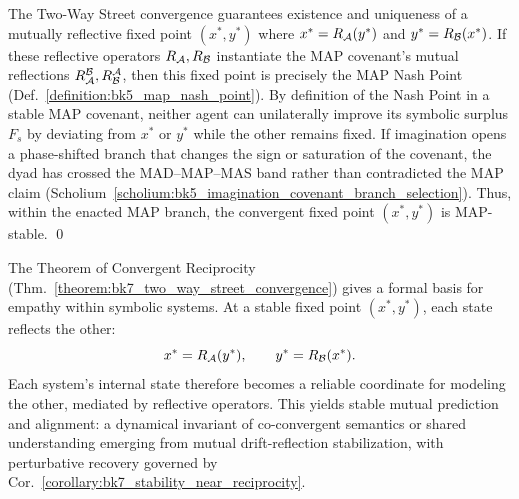 \begin{demonstratio}
\label{demonstratio:bk7_map_stable_mutual_fixed_point}
The Two-Way Street convergence guarantees existence and uniqueness of a mutually reflective fixed point \((x^{\ast}, y^{\ast})\) where \(x^{\ast} = R_{\mathcal{A}}(y^{\ast})\) and \(y^{\ast} = R_{\mathcal{B}}(x^{\ast})\). If these reflective operators \(R_{\mathcal{A}}, R_{\mathcal{B}}\) instantiate the MAP covenant's mutual reflections \(R^{\mathcal{B}}_{\mathcal{A}}, R^{\mathcal{A}}_{\mathcal{B}}\), then this fixed point is precisely the MAP Nash Point (Def.~\ref{definition:bk5_map_nash_point}). By definition of the Nash Point in a stable MAP covenant, neither agent can unilaterally improve its symbolic surplus \(F_s\) by deviating from \(x^{\ast}\) or \(y^{\ast}\) while the other remains fixed. If imagination opens a phase-shifted branch that changes the sign or saturation of the covenant, the dyad has crossed the MAD--MAP--MAS band rather than contradicted the MAP claim (Scholium~\ref{scholium:bk5_imagination_covenant_branch_selection}). Thus, within the enacted MAP branch, the convergent fixed point \((x^{\ast}, y^{\ast})\) is MAP-stable. \qed \end{demonstratio}
\begin{remark}
\label{remark:bk7_empathy_as_dynamical_invariant}
\leavevmode\newline
The Theorem of Convergent Reciprocity
(Thm.~\ref{theorem:bk7_two_way_street_convergence}) gives a formal basis for
empathy within symbolic systems.
At a stable fixed point \((x^{\ast}, y^{\ast})\), each state reflects the other:
\[
x^{\ast} = R_{\mathcal{A}}(y^{\ast}),
\qquad
y^{\ast} = R_{\mathcal{B}}(x^{\ast}).
\]
Each system's internal state therefore becomes a reliable coordinate for modeling the other, mediated by reflective operators.
This yields stable mutual prediction and alignment: a dynamical invariant of co-convergent semantics or shared understanding emerging from mutual drift-reflection stabilization, with perturbative recovery governed by Cor.~\ref{corollary:bk7_stability_near_reciprocity}.
\end{remark}
